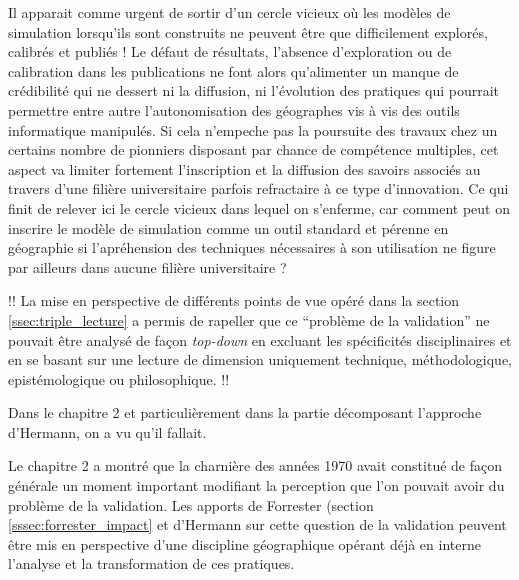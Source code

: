Il apparait comme urgent de sortir d'un cercle vicieux où les modèles de simulation lorsqu'ils sont construits ne peuvent être que difficilement explorés, calibrés et publiés ! Le défaut de résultats, l'absence d'exploration ou de calibration dans les publications ne font alors qu'alimenter un manque de crédibilité qui ne dessert ni la diffusion, ni l'évolution des pratiques qui pourrait permettre entre autre l'autonomisation des géographes vis à vis des outils informatique manipulés. Si cela n'empeche pas la poursuite des travaux chez un certains nombre de pionniers disposant par chance de compétence multiples, cet aspect va limiter fortement l'inscription et la diffusion des savoirs associés au travers d'une filière universitaire parfois refractaire à ce type d'innovation. Ce qui finit de relever ici le cercle vicieux dans lequel on s'enferme, car comment peut on inscrire le modèle de simulation comme un outil standard et pérenne en géographie si l'apréhension des techniques nécessaires à son utilisation ne figure par ailleurs dans aucune filière universitaire ? 




!!
	La mise en perspective de différents points de vue opéré dans la section \ref{ssec:triple_lecture} a permis de rapeller que ce \enquote{problème de la validation} ne pouvait être analysé de façon \textit{top-down} en excluant les spécificités disciplinaires et en se basant sur une lecture de dimension uniquement technique, méthodologique, epistémologique ou philosophique. 
!!

Dans le chapitre 2 et particulièrement dans la partie décomposant l'approche d'Hermann, on a vu qu'il fallait.


Le chapitre 2 a montré que la charnière des années 1970 avait constitué de façon générale un moment important modifiant la perception que l'on pouvait avoir du problème de la validation. Les apports de Forrester (section \ref{sssec:forrester_impact} et d'Hermann sur cette question de la validation peuvent être mis en perspective d'une discipline géographique opérant déjà en interne l'analyse et la transformation de ces pratiques. 

